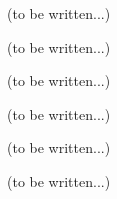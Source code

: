 \clearpage
(to be written...)


(to be written...)



(to be written...)


(to be written...)


(to be written...)


\clearpage
(to be written...)
